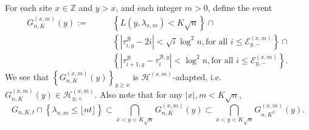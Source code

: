 \documentclass[EJP]{ejpecp} %
\newcommand{\abs}[1]{\left\vert #1 \right\vert}
\begin{document}
For each site $x \in \mathbb{Z}$ and $y > x$, and each integer $m > 0$, define the event
\begin{align}
	G_{n,K}^{(x,m)}(y) :=  \qquad
	\label{eq:good-event-5}
	& \left\{L(y,\lambda_{x,m})  < K \sqrt{n} \right\} \cap \\
	\label{eq:good-event-6}
	& \left\{\left| \tau_{i,y}^{\mathscr{B}} - 2 i \right| < \sqrt{ i } \log^2 n, \mbox{for all $i\leq  \mathcal{E}_{y,-}^{(x,m)}$} \right\}  \cap \\
	\label{eq:good-event-7}
	& \left\{\left| \tau_{i+1,y}^{\mathscr{B}} - \tau_i^{\mathscr{B},y} \right| < \log^2 n,  \mbox{for all $i\leq  \mathcal{E}_{y,-}^{(x,m)}$}  \right\}  
	.\end{align}
We see that  $\left\{G_{n, K}^{(x,m)}(y)\right\}_{y \ge x}$ is $\mathcal{H}^{(x,m)}$-adapted, i.e. $G_{n, K}^{(x,m)}(y)\in \mathcal{H}_{y, +}^{(x,m)}$.
Also note that for any $ \abs{x},m < K\sqrt{n}$, 
\begin{equation}
	\label{eq:goodgood}
	G_{n, K, t}\cap \left\{ \lambda_{x,m} \leq\lfloor nt \rfloor \right\} 
	\subset   \bigcap_{x<y< K \sqrt{n} } G_{n, K}^{(x,m)}(y) 
	\subset   \bigcap_{x<y< K \sqrt{n} } G_{n, K^2}^{(x,m)}(y)
	.\end{equation} 
\end{document}
